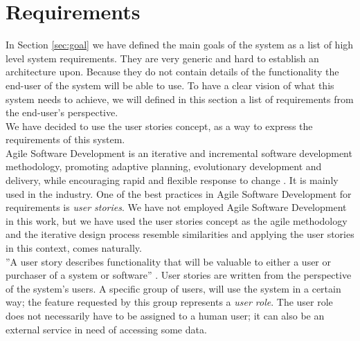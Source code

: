 \section{Requirements} %
\label{sec:requirements}
In Section \ref{sec:goal} we have defined the main goals of the system as a list of high level system requirements. They are very generic and hard to establish an architecture upon. Because they do not contain details of the functionality the end-user of the system will be able to use. To have a clear vision of what this system needs to achieve, we will defined in this section a list of requirements from the end-user's perspective.\\

We have decided to use the user stories concept\cite{cohn2004user}, as a way to express the requirements of this system.\\

Agile Software Development is an iterative and incremental software development methodology, promoting adaptive planning, evolutionary development and delivery, while encouraging rapid and flexible response to change \cite{agile:online}. It is mainly used in the industry. One of the best practices in Agile Software Development for requirements is \emph{user stories}. We have not employed Agile Software Development in this work, but we have used the user stories concept as the agile methodology and the iterative design process resemble similarities and applying the user stories in this context, comes naturally.\\

''A user story describes functionality that will be valuable to either a user or purchaser of a system or software'' \cite{cohn2004user}. User stories are written from the perspective of the system's users. A specific group of users, will use the system in a certain way; the feature requested by this group represents a \emph{user role}. The user role does not necessarily have to be assigned to a human user; it can also be an external service in need of accessing some data.\\

